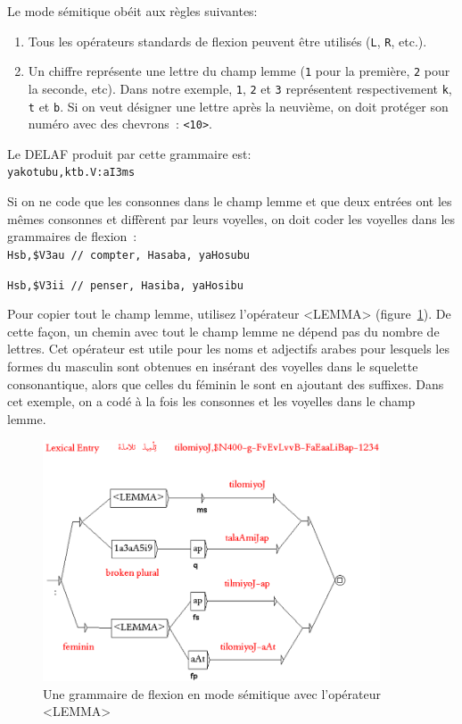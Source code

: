 \bigskip
\noindent Le mode sémitique obéit aux règles suivantes:
\begin{enumerate}
\item Tous les opérateurs standards de flexion peuvent être utilisés (\verb+L+, \verb+R+, etc.).
\item Un chiffre représente une lettre du champ lemme (\verb+1+ pour la première,
\verb+2+ pour la seconde, etc). Dans notre exemple, \verb+1+, \verb+2+ et \verb+3+ représentent
respectivement \verb+k+, \verb+t+ et \verb+b+. Si on veut désigner une lettre après la neuvième,
on doit protéger son numéro avec des chevrons~: \verb+<10>+.
\end{enumerate}  

\bigskip
\noindent Le DELAF produit par cette grammaire est:\\ 
  
\verb+yakotubu,ktb.V:aI3ms+

\bigskip
\noindent Si on ne code que les consonnes dans le champ lemme et que deux entrées ont les mêmes consonnes et diffèrent par leurs voyelles, on doit coder les voyelles dans les grammaires de flexion~:\\ 

\verb+Hsb,$V3au	// compter, Hasaba, yaHosubu+

\verb+Hsb,$V3ii	// penser, Hasiba, yaHosibu+

\bigskip
\noindent Pour copier tout le champ lemme, utilisez l'opérateur <LEMMA> (figure~\ref{LEMMA-operator}). De cette façon, un chemin avec tout le champ lemme ne dépend pas du nombre de lettres.
Cet opérateur est utile pour les noms et adjectifs arabes pour lesquels les formes du masculin sont obtenues en
insérant des voyelles dans le squelette consonantique, alors que celles du féminin le sont en ajoutant des
suffixes. Dans cet exemple, on a codé à la fois les consonnes et les voyelles dans le champ lemme.

\begin{figure}[!ht]
\begin{center}
\includegraphics[width=10cm]{resources/img/fig3-LEMMA-operator.png}
\caption{Une grammaire de flexion en mode sémitique avec l'opérateur <LEMMA>\label{LEMMA-operator}}
\end{center}
\end{figure}


